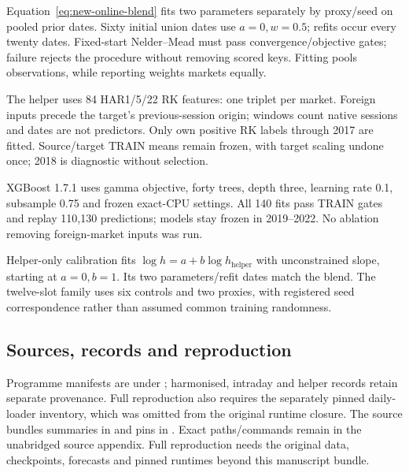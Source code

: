 Equation~\eqref{eq:new-online-blend} fits two parameters separately by proxy/seed on pooled prior dates. Sixty initial union dates use $a=0,w=0.5$; refits occur every twenty dates. Fixed-start Nelder--Mead must pass convergence/objective gates; failure rejects the procedure without removing scored keys. Fitting pools observations, while reporting weights markets equally.

The helper uses 84 HAR1/5/22 RK features: one triplet per market. Foreign inputs precede the target's previous-session origin; windows count native sessions and dates are not predictors. Only own positive RK labels through 2017 are fitted. Source/target TRAIN means remain frozen, with target scaling undone once; 2018 is diagnostic without selection.

XGBoost 1.7.1 uses gamma objective, forty trees, depth three, learning rate 0.1, subsample 0.75 and frozen exact-CPU settings. All 140 fits pass TRAIN gates and replay 110,130 predictions; models stay frozen in 2019--2022. No ablation removing foreign-market inputs was run.

Helper-only calibration fits $\log h=a+b\log h_{\mathrm{helper}}$ with unconstrained slope, starting at $a=0,b=1$. Its two parameters/refit dates match the blend. The twelve-slot family uses six controls and two proxies, with registered seed correspondence rather than assumed common training randomness.

\subsection{Sources, records and reproduction}

Programme manifests are under ; harmonised, intraday and helper records retain separate provenance. Full reproduction also requires the separately pinned daily-loader inventory, which was omitted from the original runtime closure. The source bundles summaries in  and pins in . Exact paths/commands remain in the unabridged source appendix. Full reproduction needs the original data, checkpoints, forecasts and pinned runtimes beyond this manuscript bundle.
